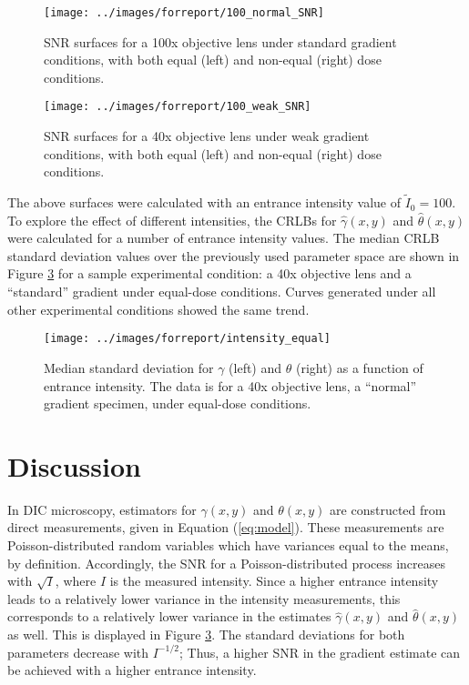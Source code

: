 \documentclass[aps, secnumarabic, amssymb, notitlepage]{article}
\begin{document}
\begin{figure}[H]
  \texttt{[image: ../images/forreport/100\_normal\_SNR]}
  \captionsetup{width=0.85\linewidth}
  \caption{SNR surfaces for a 100x objective lens under standard gradient conditions, with both equal (left) and non-equal (right) dose conditions. \label{fig:100x_N}}
\end{figure}

\begin{figure}[H]
  \texttt{[image: ../images/forreport/100\_weak\_SNR]}
  \captionsetup{width=0.85\linewidth}
  \caption{SNR surfaces for a 40x objective lens under weak gradient conditions, with both equal (left) and non-equal (right) dose conditions. \label{fig:100x_W}}
\end{figure}

The above surfaces were calculated with an entrance intensity value of $\tilde{I}_0 = 100$. To explore the effect of different intensities, the CRLBs for $\hat{\gamma}(x,y)$ and $\hat{\theta}(x,y)$ were calculated for a number of entrance intensity values. The median CRLB standard deviation values over the previously used parameter space are shown in Figure \ref{fig:intensity} for a sample experimental condition: a 40x objective lens and a ``standard'' gradient under equal-dose conditions. Curves generated under all other experimental conditions showed the same trend. 

\begin{figure}[H]
  \texttt{[image: ../images/forreport/intensity\_equal]}
  \captionsetup{width=0.85\linewidth}
  \caption{Median standard deviation for $\gamma$ (left) and $\theta$ (right) as a function of entrance intensity. The data is for a 40x objective lens, a ``normal'' gradient specimen, under equal-dose conditions.  \label{fig:intensity}}
\end{figure}

\section{Discussion}

In DIC microscopy, estimators for $\gamma(x,y)$ and $\theta(x,y)$ are constructed from direct measurements, given in Equation (\ref{eq:model}). These measurements are Poisson-distributed random variables which have variances equal to the means, by definition. Accordingly, the SNR for a Poisson-distributed process increases with $\sqrt{I}$, where $I$ is the measured intensity. Since a higher entrance intensity leads to a relatively lower variance in the intensity measurements, this corresponds to a relatively lower variance in the estimates $\hat{\gamma}(x,y)$ and $\hat{\theta}(x,y)$ as well. This is displayed in Figure \ref{fig:intensity}. The standard deviations for both parameters decrease with $I^{-1/2}$; Thus, a higher SNR in the gradient estimate can be achieved with a higher entrance intensity. 
\end{document}
